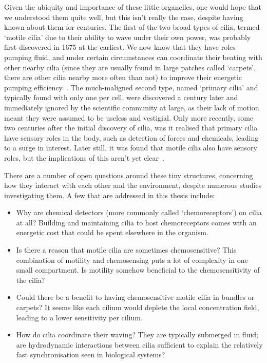 Given the ubiquity and importance of these little organelles, one would hope that we understood them quite well, but this isn't really the case, despite having known about them for centuries. The first of the two broad types of cilia, termed `motile cilia' due to their ability to wave under their own power, was probably first discovered in 1675 at the earliest. We now know that they have roles pumping fluid, and under certain circumstances can coordinate their beating with other nearby cilia (since they are usually found in large patches called `carpets', there are other cilia nearby more often than not) to improve their energetic pumping efficiency~. The much-maligned second type, named `primary cilia' and typically found with only one per cell, were discovered a century later and immediately ignored by the scientific community at large, as their lack of motion meant they were assumed to be useless and vestigial. Only more recently, some two centuries after the initial discovery of cilia, was it realised that primary cilia have sensory roles in the body, such as detection of forces and chemicals, leading to a surge in interest. Later still, it was found that motile cilia also have sensory roles, but the implications of this aren't yet clear~.

There are a number of open questions around these tiny structures, concerning how they interact with each other and the environment, despite numerous studies investigating them. A few that are addressed in this thesis include:
\begin{itemize}
    \item Why are chemical detectors (more commonly called `chemoreceptors') on cilia at all? Building and maintaining cilia to host chemoreceptors comes with an energetic cost that could be spent elsewhere in the organism.
    \item Is there a reason that motile cilia are sometimes chemosensitive? This combination of motility and chemosensing puts a lot of complexity in one small compartment. Is motility somehow beneficial to the chemosensitivity of the cilia?
    \item Could there be a benefit to having chemosensitive motile cilia in bundles or carpets? It seems like each cilium would deplete the local concentration field, leading to a lower sensitivity per cilium.
    \item How do cilia coordinate their waving? They are typically submerged in fluid; are hydrodynamic interactions between cilia sufficient to explain the relatively fast synchronisation seen in biological systems?
\end{itemize}


